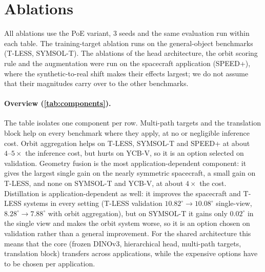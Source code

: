 \section{Ablations}
\label{sec:ablations}
All ablations use the PoE variant, 3 seeds and the same evaluation run within each table. The training-target ablation runs on the general-object benchmarks (T-LESS, SYMSOL-T). The ablations of the head architecture, the orbit scoring rule and the augmentation were run on the spacecraft application (SPEED+), where the synthetic-to-real shift makes their effects largest; we do not assume that their magnitudes carry over to the other benchmarks.

\begin{table}[t]
  \centering\footnotesize
  \setlength{\tabcolsep}{4pt}
  \resizebox{\linewidth}{!}{}
  \caption{\textbf{Component contributions under matched controls.} Each row changes one component and keeps features, recipe, seeds and evaluation fixed; values are means over 3 seeds ($^\circ$ unless stated; lower is better except recall). Extra cost: end-to-end inference time relative to the configuration without the component, measured on SPEED+ crops (\cref{tab:cost_infer}; the roll-homography warp used for T-LESS and YCB-V is not timed), or added parameters. Source runs are recorded next to each row in the table generator.}
  \label{tab:components}
\end{table}

\paragraph{Overview (\cref{tab:components}).} The table isolates one component per row. Multi-path targets and the translation block help on every benchmark where they apply, at no or negligible inference cost. Orbit aggregation helps on T-LESS, SYMSOL-T and SPEED+ at about $4\text{--}5\times$ the inference cost, but hurts on YCB-V, so it is an option selected on validation. Geometry fusion is the most application-dependent component: it gives the largest single gain on the nearly symmetric spacecraft, a small gain on T-LESS, and none on SYMSOL-T and YCB-V, at about $4\times$ the cost. Distillation is application-dependent as well: it improves the spacecraft and T-LESS systems in every setting (T-LESS validation $10.82^\circ\to10.08^\circ$ single-view, $8.28^\circ\to7.88^\circ$ with orbit aggregation), but on SYMSOL-T it gains only $0.02^\circ$ in the single view and makes the orbit system worse, so it is an option chosen on validation rather than a general improvement. For the shared architecture this means that the core (frozen DINOv3, hierarchical head, multi-path targets, translation block) transfers across applications, while the expensive options have to be chosen per application.

